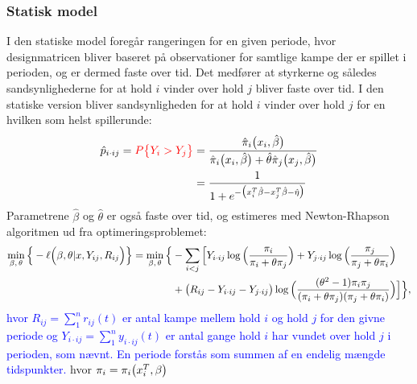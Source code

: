 \documentclass[11pt,a4paper]{article}
\begin{document}
\subsubsection{Statisk model}
I den statiske model foregår rangeringen for en given periode, hvor designmatricen bliver baseret på observationer for samtlige kampe der er spillet i perioden, og er dermed faste over tid. Det medfører at styrkerne og således sandsynlighederne for at hold $i$ vinder over hold $j$ bliver faste over tid. I den statiske version bliver sandsynligheden for at hold $i$ vinder over hold $j$ for en hvilken som helst spillerunde:
\begin{align}
    \hat{p}_{i\cdot ij}=\textcolor{red}{{P\big{\{}Y_i>Y_j\big{\}}}}
    &=\frac{\hat{\pi}_i\big{(}x_i,\hat{\beta}\big{)}}{\hat{\pi}_i\big{(}x_i,\hat{\beta}\big{)}+\hat{\theta}\hat{\pi}_j\big{(}x_j,\hat{\beta}\big{)}}\\
    &=\frac{1}{1+e^{-\big{(}x_i^T\hat{\beta}-x_j^T\hat{\beta}-\hat{\eta}\big{)}}}
\end{align}
Parametrene $\hat{\beta}$ og $\hat{\theta}$ er også faste over tid, og estimeres med Newton-Rhapson algoritmen ud fra optimeringsproblemet:
\begin{align*}
\min_{\beta,\,\theta} \Big{\{}-\ell\Big{(}\beta,\theta|x,Y_{ij},R_{ij}\Big{)}\Big{\}}=
\min_{\beta,\,\theta} \Big{\{}&- \sum_{i<j}\Big{[}Y_{i\cdot ij}\log\Big{(}\frac{\pi_i}{\pi_i+\theta\pi_j}\Big{)}
+ Y_{j\cdot ij}\log\Big{(}\frac{\pi_j}{\pi_j+\theta\pi_i}\Big{)}\\
&+ \big{(}R_{ij}-Y_{i\cdot ij}-Y_{j\cdot ij}\big{)} \log\Big{(}\frac{(\theta^2-1)\pi_i \pi_j}{(\pi_i+\theta\pi_j)(\pi_j+\theta\pi_i)}\Big{)}\Big{]}\Big{\}},\\
\end{align*}
\textcolor{blue}{hvor $R_{ij}=\sum_1^n r_{ij}(t)$ er antal kampe mellem hold $i$ og hold $j$ for den givne periode og $Y_{i\cdot ij}=\sum_1^n y_{i \cdot ij}(t)$ er antal gange hold $i$ har vundet over hold $j$ i perioden, som nævnt. En periode forstås som summen af en endelig mængde tidspunkter. } hvor $\pi_i=\pi_i\big{(}x_i^T,\beta\big{)}$
\end{document}
